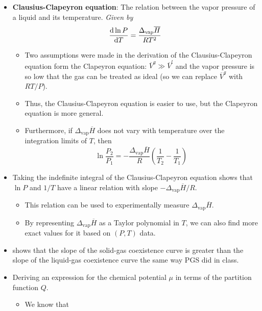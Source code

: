 \documentclass[../notes.tex]{subfiles}
\begin{document}
\begin{itemize}
    \item \textbf{Clausius-Clapeyron equation}: The relation between the vapor pressure of a liquid and its temperature. \emph{Given by}
    \begin{equation*}
        \dv{\ln P}{T} = \frac{\Delta_\text{vap}\overline{H}}{RT^2}
    \end{equation*}
    \begin{itemize}
        \item Two assumptions were made in the derivation of the Clausius-Clapeyron equation form the Clapeyron equation: $\overline{V}^g\gg\overline{V}^l$ and the vapor pressure is so low that the gas can be treated as ideal (so we can replace $\overline{V}^g$ with $RT/P$).
        \item Thus, the Clausius-Clapeyron equation is easier to use, but the Clapeyron equation is more general.
        \item Furthermore, if $\Delta_\text{vap}\overline{H}$ does not vary with temperature over the integration limits of $T$, then
        \begin{equation*}
            \ln\frac{P_2}{P_1} = -\frac{\Delta_\text{vap}\overline{H}}{R}\left( \frac{1}{T_2}-\frac{1}{T_1} \right)
        \end{equation*}
    \end{itemize}
    \item Taking the indefinite integral of the Clausius-Clapeyron equation shows that $\ln P$ and $1/T$ have a linear relation with slope $-\Delta_\text{vap}\overline{H}/R$.
    \begin{itemize}
        \item This relation can be used to experimentally measure $\Delta_\text{vap}\overline{H}$.
        \item By representing $\Delta_\text{vap}\overline{H}$ as a Taylor polynomial in $T$, we can also find more exact values for it based on $(P,T)$ data.
    \end{itemize}
    \item \textcite{bib:McQuarrieSimon} shows that the slope of the solid-gas coexistence curve is greater than the slope of the liquid-gas coexistence curve the same way PGS did in class.
    \item Deriving an expression for the chemical potential $\mu$ in terms of the partition function $Q$.
    \begin{itemize}
        \item We know that
        \begin{align*}

\end{align*}
\end{itemize}
\end{itemize}
\end{document}
